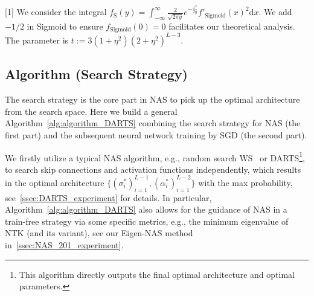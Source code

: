 \documentclass[nohyperref]{article}
\theoremstyle{plain}
\theoremstyle{definition}
\theoremstyle{remark}
\begin{document}
\begin{table*}[t]
\small
\centering
\begin{threeparttable}
\caption{Formula of different activation functions, definitions of relevant constants and some intermediate results.}
\label{tab:activation_functions}
	\begin{tablenotes}
				\footnotesize
				\item[{[1]}] We consider the integral $f_{\mathrm{S}}(y) =\int_{-\infty}^{\infty}\frac{2}{\sqrt{2\pi y}}e^{-\frac{x^2}{2y}}{f'_{\mathrm{Sigmoid}}}(x)^2\mathrm{d}x.$ We add $-1/2$ in Sigmoid to ensure $f_{\mathrm{Sigmoid}}(0)=0$ facilitates our theoretical analysis. The parameter is $t := 3(1+\eta^2)(2+\eta^2)^{L-3}$.
			\end{tablenotes}
\end{threeparttable}
\end{table*}


\subsection{Algorithm (Search Strategy)}
\label{ssec:algorithm}

The search strategy is the core part in NAS to pick up the optimal architecture from the search space. 
Here we build a general Algorithm~\ref{alg:algorithm_DARTS} combining the search strategy for NAS (the first part) and the subsequent neural network training by SGD (the second part). 

We firstly utilize a typical NAS algorithm, e.g., random search WS~\citep{li2020random} or DARTS\footnote{This algorithm directly outputs the final optimal architecture and optimal parameters.}, to search skip connections and activation functions independently, which results in the optimal architecture $\{ (\sigma^*_i)_{i=1}^{L-1}, (\alpha^*_i)_{i=1}^{L-2} \}$ with the max probability, see~\cref{ssec:DARTS_experiment} for details.
In particular, Algorithm~\ref{alg:algorithm_DARTS} also allows for the guidance of NAS in a  train-free strategy via some specific metrics, e.g., the minimum eigenvalue of NTK (and its variant), see our Eigen-NAS method in~\cref{ssec:NAS_201_experiment}.
\end{document}
